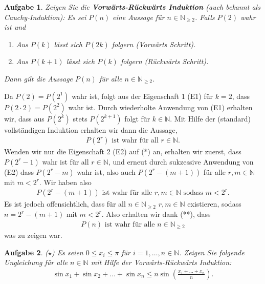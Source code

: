 \documentclass[a4paper, 20]{exam}
\newtheorem{ex}{Aufgabe}
\begin{document}
\begin{ex} Zeigen Sie die \textbf{Vorwärts-Rückwärts Induktion} (auch bekannt als Cauchy-Induktion): Es sei $P(n)$ eine Aussage für $n \in \mathbb{N}_{ \geq 2}$. Falls $P(2)$ wahr ist und 
\begin{enumerate}
\item Aus $P(k)$ lässt sich $P(2k)$ folgern (Vorwärts Schritt).
\item Aus $P(k+1)$ lässt sich $P(k)$ folgern (Rückwärts Schritt).
\end{enumerate}
Dann gilt die Aussage $P(n)$ für alle $n \in \mathbb{N}_{ \geq 2}$.
\end{ex}
\begin{solution} Da $P(2)=P(2^1)$ wahr ist, folgt aus der Eigenschaft 1 (E1) für $k=2$, dass $P(2\cdot 2)=P(2^2)$ wahr ist. Durch wiederholte Anwendung von (E1) erhalten wir, dass aus $P(2^k)$ stets $P(2^{k+1})$ folgt für $k \in \mathbb{N}$. Mit Hilfe der (standard) vollständigen Induktion erhalten wir dann die Aussage,
\begin{align*}
P(2^r) \text{ ist wahr für all } r \in \mathbb{N}. \tag{*}
\end{align*}
Wenden wir nur die Eigenschaft 2 (E2) auf (*) an, erhalten wir zuerst, dass $P(2^r-1)$ wahr ist für all $r \in \mathbb{N}$, und erneut durch sukzessive Anwendung von (E2) dass $P(2^r-m)$ wahr ist, also auch $P(2^r-(m+1))$ für alle $r,m \in \mathbb{N}$ mit $m < 2^r$. Wir haben also 
\begin{align*}
P(2^r-(m+1)) \text{ ist wahr für alle }r,m \in \mathbb{N} \text{ sodass } m < 2^r. \tag{**}
\end{align*}
Es ist jedoch offensichtlich, dass für all $n \in \mathbb{N}_{\geq 2}$ $r,m \in \mathbb{N}$ existieren, sodass $n= 2^r-(m+1)$ mit $m<2^r$. Also erhalten wir dank (**), dass 
\begin{align*}
P(n) \text{ ist wahr für alle } n \in \mathbb{N}_{ \geq 2}
\end{align*}
was zu zeigen war.
\end{solution}

\begin{ex}{($\star$)} Es seien $0 \leq x_i \leq \pi$ für $i=1, \dots , n \in \mathbb{N}$. Zeigen Sie folgende Ungleichung für alle $n \in \mathbb{N}$ mit Hilfe der Vorwärts-Rückwärts Induktion: 
\begin{align*}
\sin x_1 + \sin x_2 + \dots + \sin x_n \leq n \sin \left( \frac{x_1 + \dots + x_n}{n}\right).
\end{align*}
\end{ex}
\end{document}
